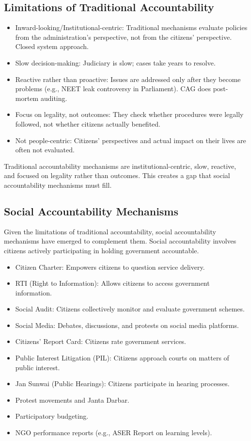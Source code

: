 \subsection{Limitations of Traditional Accountability}
\begin{itemize}
\item Inward-looking/Institutional-centric: Traditional mechanisms evaluate policies from the administration's perspective, not from the citizens' perspective. Closed system approach.
\item Slow decision-making: Judiciary is slow; cases take years to resolve.
\item Reactive rather than proactive: Issues are addressed only after they become problems (e.g., NEET leak controversy in Parliament). CAG does post-mortem auditing.
\item Focus on legality, not outcomes: They check whether procedures were legally followed, not whether citizens actually benefited.
\item Not people-centric: Citizens' perspectives and actual impact on their lives are often not evaluated.
\end{itemize}

\begin{CriticalPoint}
Traditional accountability mechanisms are institutional-centric, slow, reactive, and focused on legality rather than outcomes. This creates a gap that social accountability mechanisms must fill.
\end{CriticalPoint}

\subsection{Social Accountability Mechanisms}
Given the limitations of traditional accountability, social accountability mechanisms have emerged to complement them. Social accountability involves citizens actively participating in holding government accountable.
\begin{itemize}
\item Citizen Charter: Empowers citizens to question service delivery.
\item RTI (Right to Information): Allows citizens to access government information.
\item Social Audit: Citizens collectively monitor and evaluate government schemes.
\item Social Media: Debates, discussions, and protests on social media platforms.
\item Citizens' Report Card: Citizens rate government services.
\item Public Interest Litigation (PIL): Citizens approach courts on matters of public interest.
\item Jan Sunwai (Public Hearings): Citizens participate in hearing processes.
\item Protest movements and Janta Darbar.
\item Participatory budgeting.
\item NGO performance reports (e.g., ASER Report on learning levels).
\end{itemize}

